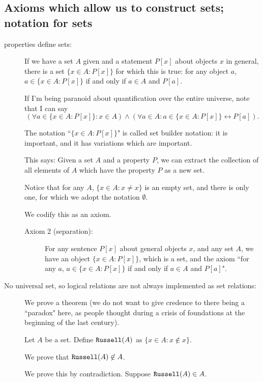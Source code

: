 \documentclass[12pt]{article}
\begin{document}
\subsection{Axioms which allow us to construct sets;  notation for sets}
\begin{description}
\item[properties define sets:]  If we have a set $A$ given and a statement $P[x]$ about objects  $x$ in general, there is a set
$\{x \in A:P[x]\}$ for which this is true:  for any object $a$, $a \in \{x \in A:P[x]\}$ if and only if $a \in A$ and $P[a]$.

If I'm being paranoid about quantification over the entire universe, note that I can say $$(\forall a \in \{x \in A:P[x]\}: x \in A) \wedge (\forall a \in A: a \in \{x \in A:P[x]\} \leftrightarrow P[a]).$$

The notation ``$\{x \in A:P[x]\}$" is called set builder notation:  it is important, and it has variations which are important.

This says:  Given a set $A$ and a property $P$, we can extract the collection of all elements of $A$ which have the property $P$ as a new set.

Notice that for any $A$, $\{x \in A:x \neq x\}$ is an empty set, and there is only one, for which we adopt the notation $\emptyset$.

We codify this as an axiom.

\begin{description}

\item[Axiom 2 (separation):]  For any sentence $P[x]$ about general objects $x$, and any set $A$, we have
an object $\{x \in A:P[x]\}$, which is a set, and the axiom ``for any $a$, $a \in \{x \in A:P[x]\}$ if and only if $a \in A$ and $P[a]$".

\end{description}

\item[No universal set, so logical relations are not always implemented as set relations:]

We prove a theorem (we do not want to give credence to there being a ``paradox" here, as people thought during a crisis of foundations at the beginning of the last century).

Let $A$ be a set.  Define ${\tt Russell}(A)$ as $\{x \in A:x \not\in x\}$.

We prove that ${\tt Russell}(A)\not\in A$.

We prove this by contradiction.  Suppose ${\tt Russell}(A)\in A$.  


\end{description}
\end{document}
